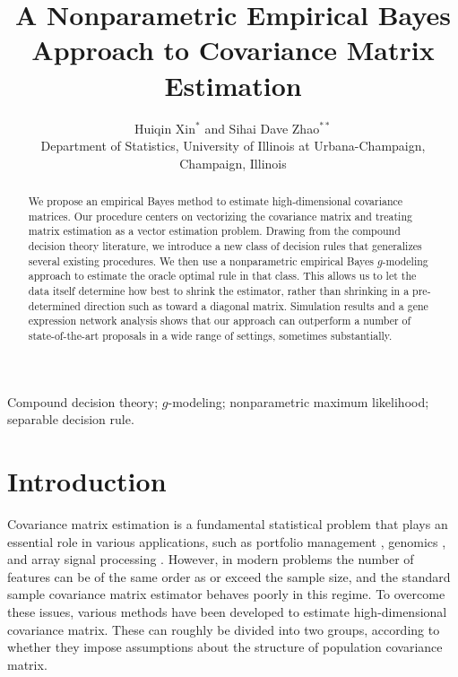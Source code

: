\documentclass[useAMS,referee,usenatbib]{biom}
\title[Empirical Bayes Covariance Matrix Estimation]{A Nonparametric Empirical Bayes Approach to Covariance Matrix Estimation}
\author{Huiqin Xin$^{*}$\email{huiqinx2@illinois.edu } and
Sihai Dave Zhao$^{**}$\email{sdzhao@illinois.edu} \\
Department of Statistics, University of Illinois at Urbana-Champaign, Champaign, Illinois}
\begin{document}

\label{firstpage}
\begin{abstract}
  We propose an empirical Bayes method to estimate high-dimensional covariance matrices. Our procedure centers on vectorizing the covariance matrix and treating matrix estimation as a vector estimation problem. Drawing from the compound decision theory literature, we introduce a new class of decision rules that generalizes several existing procedures. We then use a nonparametric empirical Bayes $g$-modeling approach to estimate the oracle optimal rule in that class. This allows us to let the data itself determine how best to shrink the estimator, rather than shrinking in a pre-determined direction such as toward a diagonal matrix. Simulation results and a gene expression network analysis shows that our approach can outperform a number of state-of-the-art proposals in a wide range of settings, sometimes substantially.
\end{abstract}

\begin{keywords}
Compound decision theory; $g$-modeling; nonparametric maximum likelihood; separable decision rule.
\end{keywords}

\maketitle

\section{Introduction}
\label{introduction}

Covariance matrix estimation is a fundamental statistical problem that plays an essential role in various applications, such as portfolio management \citep{ledoit2003improved}, genomics \citep{schafer2005shrinkage}, and array signal processing \citep{abramovich2001locally}. However, in modern problems the number of features can be of the same order as or exceed the sample size, and the standard sample covariance matrix estimator behaves poorly in this regime. To overcome these issues, various methods have been developed to estimate high-dimensional covariance matrix. These can roughly be divided into two groups, according to whether they impose assumptions about the structure of population covariance matrix.
\end{document}
